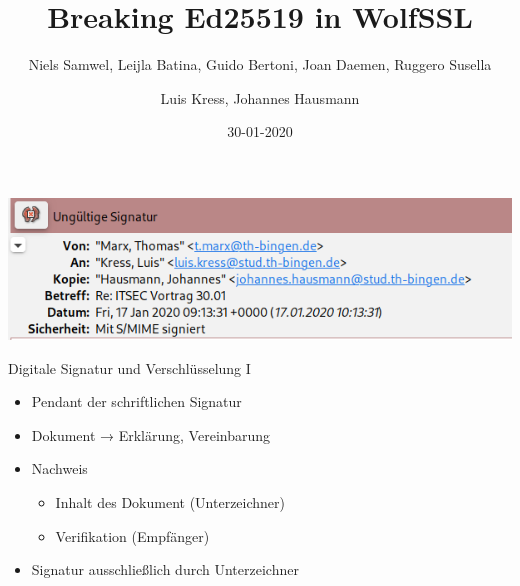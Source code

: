 \documentclass[
  11 pt,
  ignorenonframetext,
  aspectratio=43,
]{beamer}
\title{Breaking Ed25519 in WolfSSL}
\subtitle{Niels Samwel, Leijla Batina, Guido Bertoni, Joan Daemen,
Ruggero Susella}
\author{Luis Kress, Johannes Hausmann}
\date{30-01-2020}
\institute{Technische Hochschule Bingen}
\providecommand{\tightlist}{%
  \setlength{\itemsep}{0pt}\setlength{\parskip}{0pt}}
\begin{document}
\frame{\titlepage}

\begin{frame}[allowframebreaks]
  \tableofcontents[hideallsubsections]
\end{frame}
\begin{frame}
\includegraphics{Abbildungen/ksig.png}
\end{frame}

\begin{frame}{Digitale Signatur und Verschlüsselung I}
\protect\hypertarget{digitale-signatur-und-verschluxfcsselung-i}{}
\begin{itemize}
\tightlist
\item
  Pendant der schriftlichen Signatur
\end{itemize}

\pause

\begin{itemize}
\tightlist
\item
  Dokument → Erklärung, Vereinbarung
\end{itemize}

\pause

\begin{itemize}
\tightlist
\item
  Nachweis

  \begin{itemize}
  \tightlist
  \item
    Inhalt des Dokument (Unterzeichner)
  \item
    Verifikation (Empfänger)
  \end{itemize}
\end{itemize}

\pause

\begin{itemize}
\tightlist
\item
  Signatur ausschließlich durch Unterzeichner
\end{itemize}

\pause

\end{frame}
\end{document}
